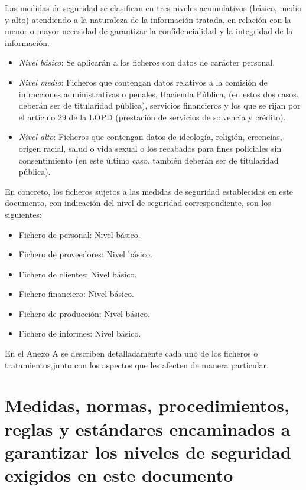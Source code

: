 \documentclass[a4paper,11pt,bibtotoc,noliststotoc]{scrbook}
\begin{document}
Las medidas de seguridad se clasifican en tres niveles acumulativos (básico, medio y alto) atendiendo a la naturaleza de la información tratada, en relación con la menor o mayor necesidad de garantizar la confidencialidad y la integridad de la información.

\begin{itemize}
\item \emph{Nivel básico}: Se aplicarán a los ficheros con datos de carácter personal.

\item \emph{Nivel medio}: Ficheros que contengan datos relativos a la comisión de infracciones administrativas o penales, Hacienda Pública, (en estos dos casos, deberán ser de titularidad pública), servicios financieros y los que se rijan por el artículo 29 de la LOPD (prestación de servicios de solvencia y crédito).

\item \emph{Nivel alto}: Ficheros que contengan datos de ideología, religión, creencias, origen racial, salud o vida sexual o los recabados para fines policiales sin consentimiento (en este último caso, también deberán ser de titularidad pública).
\end{itemize}

En concreto, los ficheros sujetos a las medidas de seguridad establecidas en este documento, con indicación del nivel de seguridad correspondiente, son los siguientes:
\begin{itemize}
	\item Fichero de personal: Nivel básico.
	\item Fichero de proveedores: Nivel básico.
	\item Fichero de clientes: Nivel básico.
	\item Fichero financiero: Nivel básico.
	\item Fichero de producción: Nivel básico.
	\item Fichero de informes: Nivel básico.
\end{itemize}

En el Anexo A se describen detalladamente cada uno de los ficheros o tratamientos,junto con los aspectos que les afecten de manera particular.


\chapter{Medidas, normas, procedimientos, reglas y estándares encaminados a garantizar los niveles de seguridad exigidos en este documento}
\end{document}
